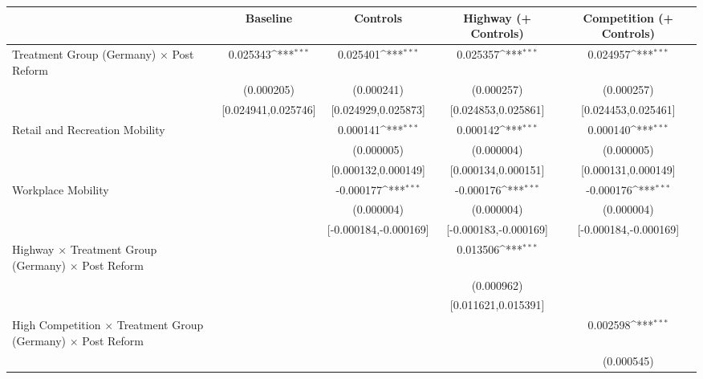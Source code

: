 {
\def\sym#1{\ifmmode^{#1}\else\(^{#1}\)\fi}
\begin{tabular}{l*{4}{c}}
\toprule
                    &\multicolumn{1}{c}{Baseline}&\multicolumn{1}{c}{Controls}&\multicolumn{1}{c}{Highway (+ Controls)}&\multicolumn{1}{c}{Competition (+ Controls)}\\
\midrule
Treatment Group (Germany) $\times$ Post Reform&    0.025343\sym{***}&    0.025401\sym{***}&    0.025357\sym{***}&    0.024957\sym{***}\\
                    &  (0.000205)         &  (0.000241)         &  (0.000257)         &  (0.000257)         \\
                    &[0.024941,0.025746]         &[0.024929,0.025873]         &[0.024853,0.025861]         &[0.024453,0.025461]         \\
Retail and Recreation Mobility&                     &    0.000141\sym{***}&    0.000142\sym{***}&    0.000140\sym{***}\\
                    &                     &  (0.000005)         &  (0.000004)         &  (0.000005)         \\
                    &                     &[0.000132,0.000149]         &[0.000134,0.000151]         &[0.000131,0.000149]         \\
Workplace Mobility  &                     &   -0.000177\sym{***}&   -0.000176\sym{***}&   -0.000176\sym{***}\\
                    &                     &  (0.000004)         &  (0.000004)         &  (0.000004)         \\
                    &                     &[-0.000184,-0.000169]         &[-0.000183,-0.000169]         &[-0.000184,-0.000169]         \\
Highway $\times$ Treatment Group (Germany) $\times$ Post Reform&                     &                     &    0.013506\sym{***}&                     \\
                    &                     &                     &  (0.000962)         &                     \\
                    &                     &                     &[0.011621,0.015391]         &                     \\
High Competition $\times$ Treatment Group (Germany) $\times$ Post Reform&                     &                     &                     &    0.002598\sym{***}\\
                    &                     &                     &                     &  (0.000545)         \\

\end{tabular}}
